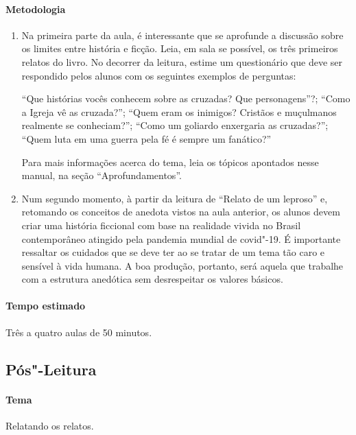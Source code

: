 \documentclass[12pt]{extarticle}
\begin{document}
 \paragraph{Metodologia}
 	\begin{enumerate}
 		\item
 		Na primeira parte da aula, é interessante que se aprofunde a discussão sobre 
 		os limites entre história e ficção. Leia, em sala se possível, os três
 		primeiros relatos do livro. No decorrer da leitura, estime um questionário
 		que deve ser respondido pelos alunos com os seguintes exemplos de perguntas: 

 		``Que histórias vocês conhecem sobre as cruzadas? Que personagens''?; ``Como a Igreja vê as cruzada?'';	``Quem eram os inimigos? Cristãos e muçulmanos realmente se conheciam?''; ``Como um goliardo enxergaria as cruzadas?'';	``Quem luta em uma guerra pela fé é sempre um fanático?'' 

 		Para mais informações acerca do tema, leia os tópicos apontados nesse manual, na seção ``Aprofundamentos''. 
 	
 		\item
 		Num segundo momento, à partir da leitura de ``Relato de um leproso'' e, retomando os 
 		conceitos de anedota vistos na aula anterior,
 		os alunos devem criar uma história ficcional com base na realidade vivida
 		no Brasil contemporâneo atingido pela pandemia mundial de covid"-19.
 		É importante ressaltar os cuidados que se deve ter ao se tratar de um tema
 		tão caro e sensível à vida humana. A boa produção, portanto, será aquela que 
 		trabalhe com a estrutura anedótica sem desrespeitar os valores básicos.

 	\end{enumerate}
 \paragraph{Tempo estimado} Três a quatro aulas de 50 minutos.


\subsection{Pós"-Leitura}

 \paragraph{Tema} Relatando os relatos.
\end{document}
